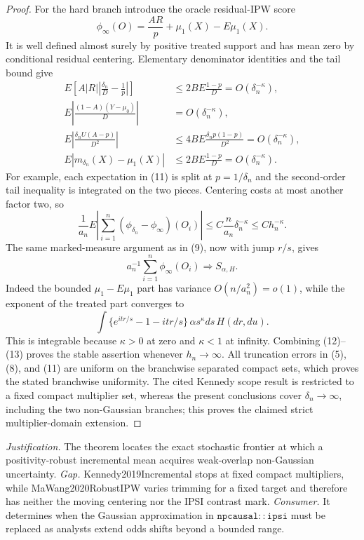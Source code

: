 \documentclass{article}
\begin{document}
\begin{proof}
For the hard branch introduce the oracle residual-IPW score
\[
 \phi_\infty(O)=\frac{AR}{p}+\mu_1(X)-E\mu_1(X).
\]
It is well defined almost surely by positive treated support and has mean zero by conditional residual centering.  Elementary denominator identities and the tail bound give
\[
\begin{split}
 E\left[A|R|\left|\frac{\delta_n}{D}-\frac1p\right|\right]
 &\leq 2B E\frac{1-p}{D}=O(\delta_n^{-\kappa}),\\
 E\left|\frac{(1-A)(Y-\mu_0)}D\right|&=O(\delta_n^{-\kappa}),\\
 E\left|\frac{\delta_nU(A-p)}{D^2}\right|&\leq4B E\frac{\delta_np(1-p)}{D^2}=O(\delta_n^{-\kappa}),\\
 E|m_{\delta_n}(X)-\mu_1(X)|&\leq2B E\frac{1-p}{D}=O(\delta_n^{-\kappa}).
\end{split} \tag{11}
\]
For example, each expectation in (11) is split at \(p=1/\delta_n\) and the second-order tail inequality is integrated on the two pieces.  Centering costs at most another factor two, so
\[
 \frac1{a_n}E\left|\sum_{i=1}^n(\phi_{\delta_n}-\phi_\infty)(O_i)\right|
 \leq C\frac n{a_n}\delta_n^{-\kappa}\leq C h_n^{-\kappa}. \tag{12}
\]
The same marked-measure argument as in (9), now with jump \(r/s\), gives
\[
 a_n^{-1}\sum_{i=1}^n\phi_\infty(O_i)\Rightarrow S_{\alpha,H}. \tag{13}
\]
Indeed the bounded \(\mu_1-E\mu_1\) part has variance \(O(n/a_n^2)=o(1)\), while the exponent of the treated part converges to
\[
 \int\{e^{itr/s}-1-itr/s\}\,\alpha s^\kappa ds\,H(dr,du).
\]
This is integrable because \(\kappa>0\) at zero and \(\kappa<1\) at infinity.  Combining (12)--(13) proves the stable assertion whenever \(h_n\to\infty\).  All truncation errors in (5), (8), and (11) are uniform on the branchwise separated compact sets, which proves the stated branchwise uniformity.  The cited Kennedy scope result is restricted to a fixed compact multiplier set, whereas the present conclusions cover \(\delta_n\to\infty\), including the two non-Gaussian branches; this proves the claimed strict multiplier-domain extension.
\end{proof}
\par\smallskip\noindent \textit{Justification.} The theorem locates the exact stochastic frontier at which a positivity-robust incremental mean acquires weak-overlap non-Gaussian uncertainty. \textit{Gap.} Kennedy2019Incremental stops at fixed compact multipliers, while MaWang2020RobustIPW varies trimming for a fixed target and therefore has neither the moving centering nor the IPSI contrast mark. \textit{Consumer.} It determines when the Gaussian approximation in \(\mathtt{npcausal::ipsi}\) must be replaced as analysts extend odds shifts beyond a bounded range.
\end{document}
